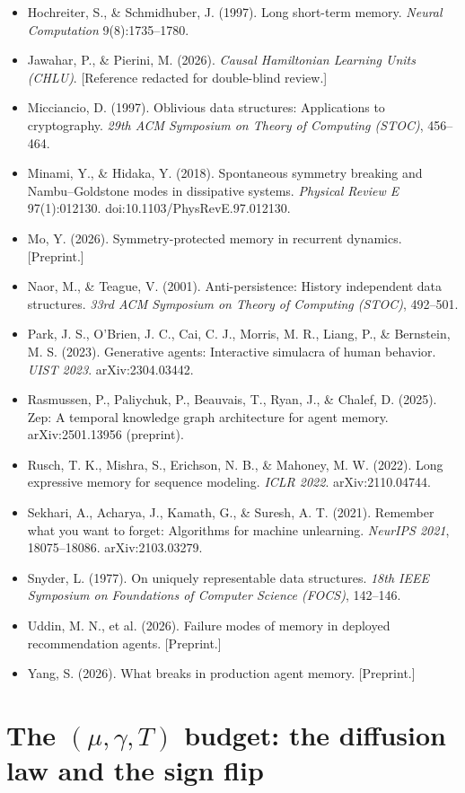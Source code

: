 \documentclass{article}
\begin{document}
{\begin{itemize}
\item Hochreiter, S., \& Schmidhuber, J. (1997). Long short-term memory. \emph{Neural Computation} 9(8):1735--1780.
\item Jawahar, P., \& Pierini, M. (2026). \emph{Causal Hamiltonian Learning Units (CHLU)}. [Reference redacted for double-blind review.]
\item Micciancio, D. (1997). Oblivious data structures: Applications to cryptography. \emph{29th ACM Symposium on Theory of Computing (STOC)}, 456--464.
\item Minami, Y., \& Hidaka, Y. (2018). Spontaneous symmetry breaking and Nambu--Goldstone modes in dissipative systems. \emph{Physical Review E} 97(1):012130. doi:10.1103/PhysRevE.97.012130.
\item Mo, Y. (2026). Symmetry-protected memory in recurrent dynamics. [Preprint.]
\item Naor, M., \& Teague, V. (2001). Anti-persistence: History independent data structures. \emph{33rd ACM Symposium on Theory of Computing (STOC)}, 492--501.
\item Park, J. S., O'Brien, J. C., Cai, C. J., Morris, M. R., Liang, P., \& Bernstein, M. S. (2023). Generative agents: Interactive simulacra of human behavior. \emph{UIST 2023}. arXiv:2304.03442.
\item Rasmussen, P., Paliychuk, P., Beauvais, T., Ryan, J., \& Chalef, D. (2025). Zep: A temporal knowledge graph architecture for agent memory. arXiv:2501.13956 (preprint).
\item Rusch, T. K., Mishra, S., Erichson, N. B., \& Mahoney, M. W. (2022). Long expressive memory for sequence modeling. \emph{ICLR 2022}. arXiv:2110.04744.
\item Sekhari, A., Acharya, J., Kamath, G., \& Suresh, A. T. (2021). Remember what you want to forget: Algorithms for machine unlearning. \emph{NeurIPS 2021}, 18075--18086. arXiv:2103.03279.
\item Snyder, L. (1977). On uniquely representable data structures. \emph{18th IEEE Symposium on Foundations of Computer Science (FOCS)}, 142--146.
\item Uddin, M. N., et al. (2026). Failure modes of memory in deployed recommendation agents. [Preprint.]
\item Yang, S. (2026). What breaks in production agent memory. [Preprint.]
\end{itemize}\par}

\section{The $(\mu,\gamma,T)$ budget: the diffusion law and the sign flip}\label{app:budget}
\end{document}
